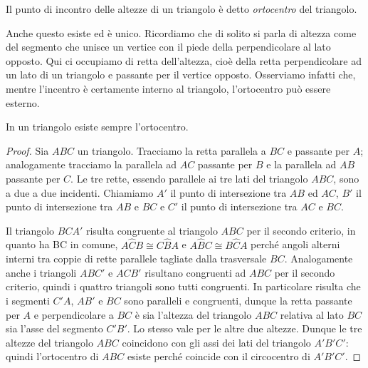 \begin{definizione}
Il punto di incontro delle altezze di un triangolo è detto 
\emph{ortocentro} del triangolo.
\end{definizione}

Anche questo esiste ed è unico. Ricordiamo che di solito si parla di 
altezza come del segmento che unisce un vertice con il piede della 
perpendicolare al lato opposto. Qui ci occupiamo di retta 
dell'altezza, cioè della retta perpendicolare ad un lato di un 
triangolo e passante per il vertice opposto. Osserviamo infatti che, 
mentre l'incentro è certamente interno al triangolo, l'ortocentro può 
essere esterno.

\begin{teorema}
In un triangolo esiste sempre l'ortocentro.
\end{teorema}


\begin{inaccessibleblock}
 \begin{figure}[htb]
	\centering
\end{figure}
\end{inaccessibleblock}

\begin{proof}
Sia $ABC$ un triangolo. Tracciamo la retta parallela a $BC$ e 
passante per $A$; analogamente tracciamo la parallela ad $AC$ passante 
per $B$ e la parallela ad $AB$ passante per $C$. Le tre rette, 
essendo parallele ai tre lati del triangolo $ABC$, sono a due a due 
incidenti. Chiamiamo $A'$ il punto di intersezione tra $AB$ ed $AC$, 
$B'$ il punto di intersezione tra $AB$ e $BC$ e $C'$ il punto di 
intersezione tra $AC$ e $BC$.

Il triangolo $BCA'$ risulta congruente al triangolo $ABC$ per il 
secondo criterio, in quanto ha BC in comune, $A\widehat{C}B\cong 
C\widehat{B}A$ e $A\widehat{B}C\cong B\widehat{C}A$ perché angoli 
alterni interni tra coppie di rette parallele tagliate dalla 
trasversale $BC$. Analogamente anche i triangoli $ABC'$ e $ACB'$ 
risultano congruenti ad $ABC$ per il secondo criterio, quindi i 
quattro triangoli sono tutti congruenti. In particolare risulta che i 
segmenti $C'A$, $AB'$ e $BC$ sono paralleli e congruenti, dunque la 
retta passante per $A$ e perpendicolare a $BC$ è sia l'altezza del 
triangolo $ABC$ relativa al lato $BC$ sia l'asse del segmento $C'B'$. 
Lo stesso vale per le altre due altezze. Dunque le tre altezze del 
triangolo $ABC$ coincidono con gli assi dei lati del triangolo 
$A'B'C'$: quindi l'ortocentro di $ABC$ esiste perché coincide con il 
circocentro di $A'B'C'$.
\end{proof}

